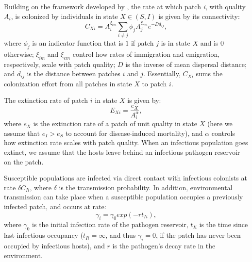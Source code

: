 \documentclass{svjour3}
\begin{document}
Building on the framework developed by \cite{Hanski2003}, the rate at which patch \emph{i}, with quality $A_i$, is colonized by individuals in state $X \in (S,I)$ is given by its connectivity:
\begin{equation}
C_{Xi}=A_i^{\xi_{im}} \sum_{i\neq j }\phi_jA_j^{\xi_{em}}e^{-D d_{ij}},
\label{connectivity}
\end{equation}
where $\phi_j$ is an indicator function that is $1$ if patch $j$ is in state $X$ and is $0$ otherwise; $\xi_{im}$ and $\xi_{em}$ control how rates of immigration and emigration, respectively, scale with patch quality; $D$ is the inverse of mean dispersal distance; and $d_{ij}$ is the distance between patches $i$ and $j$.  Essentially, $C_{Xi}$ sums the colonization effort from all patches in state $X$ to patch $i$.  

The extinction rate of patch $i$ in state $X$ is given by:
\begin{equation}
E_{Xi}=\frac{e_X}{A_i^\alpha},
\end{equation}
where $e_X$ is the extinction rate of a patch of unit quality in state $X$ (here we assume that $e_I>e_S$ to account for disease-induced mortality), and $\alpha$ controls how extinction rate scales with patch quality.  When an infectious population goes extinct, we assume that the hosts leave behind an infectious pathogen reservoir on the patch.  

Susceptible populations are infected via direct contact with infectious colonists at rate $\delta C_{Ii}$, where $\delta$ is the transmission probability.  In addition, environmental transmission can take place when a susceptible population occupies a previously infected patch, and occurs at rate:
\begin{equation}
\gamma_i=\gamma_0exp(-rt_{Ii}),
\end{equation}
where $\gamma_0$ is the initial infection rate of the pathogen reservoir, $t_{Ii}$ is the time since last infectious occupancy ($t_{Ii} = \infty$, and thus $\gamma_i = 0$, if the patch has never been occupied by infectious hosts), and $r$ is the pathogen's decay rate in the environment.
\end{document}

